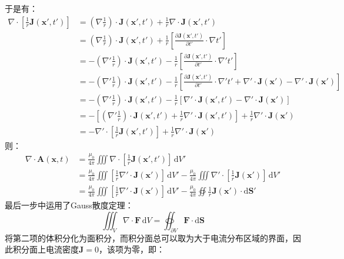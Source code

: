 \documentclass[a4paper,fontset=none]{ctexart}
\begin{document}
\begin{itemize}
        于是有：
        \begin{align*}
            \nabla \cdot \left[\frac{1}{r}\bm{J}(\bm{x}', t')\right]
            &= \left(\nabla \frac{1}{r}\right) \cdot \bm{J}(\bm{x}', t') + \frac{1}{r} \nabla \cdot \bm{J}(\bm{x}', t') \\
            &= \left(\nabla \frac{1}{r}\right) \cdot \bm{J}(\bm{x}', t') + \frac{1}{r}\left[\frac{\partial\bm{J}(\bm{x}', t')}{\partial t'} \cdot \nabla t'\right] \\
            &= -\left(\nabla' \frac{1}{r}\right) \cdot \bm{J}(\bm{x}', t') - \frac{1}{r}\left[\frac{\partial\bm{J}(\bm{x}', t')}{\partial t'} \cdot \nabla' t'\right] \\
            &= -\left(\nabla' \frac{1}{r}\right) \cdot \bm{J}(\bm{x}', t') - \frac{1}{r}\left[\frac{\partial\bm{J}(\bm{x}', t')}{\partial t'} \cdot \nabla' t' + \nabla' \cdot \bm{J}(\bm{x}') - \nabla' \cdot \bm{J}(\bm{x}')\right] \\
            &= -\left(\nabla' \frac{1}{r}\right) \cdot \bm{J}(\bm{x}', t') - \frac{1}{r}\left[\nabla' \cdot \bm{J}(\bm{x}', t') - \nabla' \cdot \bm{J}(\bm{x}')\right] \\
            &= -\left[\left(\nabla' \frac{1}{r}\right) \cdot \bm{J}(\bm{x}', t') + \frac{1}{r} \nabla' \cdot \bm{J}(\bm{x}', t')\right] + \frac{1}{r} \nabla' \cdot \bm{J}(\bm{x}') \\
            &= -\nabla' \cdot \left[\frac{1}{r}\bm{J}(\bm{x}', t')\right] + \frac{1}{r} \nabla' \cdot \bm{J}(\bm{x}')
        \end{align*}
        则：
        \begin{align*}
            \nabla \cdot \bm{A}(\bm{x}, t)
            &= \frac{\mu_0}{4\pi} \iiint \nabla \cdot \left[\frac{1}{r}\bm{J}(\bm{x}', t')\right]\,\mathrm{d}V' \\
            &= \frac{\mu_0}{4\pi} \iiint \left[\frac{1}{r} \nabla' \cdot \bm{J}(\bm{x}')\right]\,\mathrm{d}V' - \frac{\mu_0}{4\pi} \iiint \nabla' \cdot \left[\frac{1}{r}\bm{J}(\bm{x}')\right]\,\mathrm{d}V' \\
            &= \frac{\mu_0}{4\pi} \iiint \left[\frac{1}{r} \nabla' \cdot \bm{J}(\bm{x}')\right]\,\mathrm{d}V' - \frac{\mu_0}{4\pi} \oiint \frac{1}{r}\bm{J}(\bm{x}') \cdot \mathrm{d}\bm{S}'
        \end{align*}
        最后一步中运用了Gauss散度定理：
        \[
            \iiint_V \nabla \cdot \bm{F}\,\mathrm{d}V = \oiint_{\partial V} \bm{F} \cdot \mathrm{d}\bm{S}
        \]
        将第二项的体积分化为面积分，而积分面总可以取为大于电流分布区域的界面，因此积分面上电流密度$\bm{J}=0$，该项为零，即：

\end{itemize}
\end{document}
